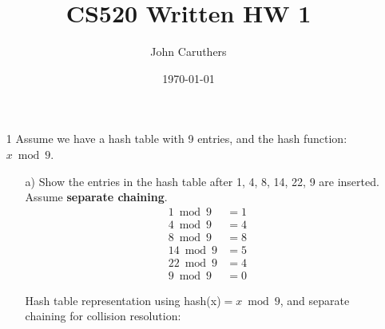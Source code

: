 \documentclass{article}
\title{CS520 Written HW 1}
\author{John Caruthers}
\date\today
\begin{document}
\maketitle

\begin{itemize}
    \item[1] Assume we have a hash table with 9 entries, and the hash function: $x\bmod{9}$.
    \begin{itemize}
        \item[a)] Show the entries in the hash table after 1, 4, 8, 14, 22, 9 are inserted. Assume \textbf{separate chaining}.
        \begin{align}
            1\bmod{9}&=1\nonumber\\
            4\bmod{9}&=4\nonumber\\
            8\bmod{9}&=8\nonumber\\
            14\bmod{9}&=5\nonumber\\
            22\bmod{9}&=4\nonumber\\
            9\bmod{9}&=0\nonumber
        \end{align}

        Hash table representation using hash(x)$=x\bmod{9}$, and separate chaining for collision resolution:
        

\end{itemize}
\end{itemize}
\end{document}
